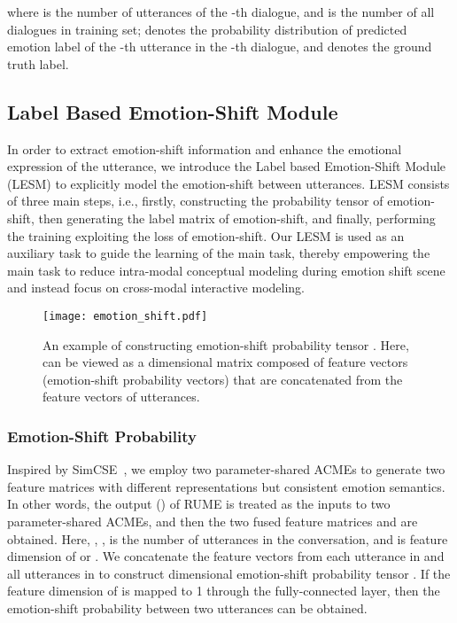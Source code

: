 \documentclass[journal]{IEEEtran}
\begin{document}
where  is the number of utterances of the -th dialogue, and  is the number of all dialogues in training set;  denotes the probability distribution of predicted emotion label of the -th utterance in the -th dialogue, and  denotes the ground truth label.

\subsection{Label Based Emotion-Shift Module}
In order to extract emotion-shift information and enhance the emotional expression of the utterance, we introduce the Label based Emotion-Shift Module (LESM) to explicitly model the emotion-shift between utterances. LESM consists of three main steps, i.e., firstly, constructing the probability tensor of emotion-shift, then generating the label matrix of emotion-shift, and finally, performing the training exploiting the loss of emotion-shift. Our LESM is used as an auxiliary task to guide the learning of the main task, thereby empowering the main task to reduce intra-modal conceptual modeling during emotion shift scene and instead focus on cross-modal interactive modeling.
\begin{figure*}[htbp]
    \centering
    \texttt{[image: emotion\_shift.pdf]}
    \caption{An example of constructing emotion-shift probability tensor . Here,  can be viewed as a  dimensional matrix composed of feature vectors (emotion-shift probability vectors) that are concatenated from the feature vectors of utterances.}
    \label{fig:emotion_shift}
\end{figure*}

\subsubsection{Emotion-Shift Probability}
Inspired by SimCSE~\cite{gao2021simcse}, we employ two parameter-shared ACMEs to generate two feature matrices with different representations but consistent emotion semantics. In other words, the output  () of RUME is treated as the inputs to two parameter-shared ACMEs, and then the two fused feature matrices  and  are obtained. Here, , ,  is the number of utterances in the conversation, and  is feature dimension of  or . We concatenate the feature vectors from each utterance in  and all utterances in  to construct  dimensional emotion-shift probability tensor . If the feature dimension of  is mapped to 1 through the fully-connected layer, then the emotion-shift probability between two utterances can be obtained.
\end{document}
